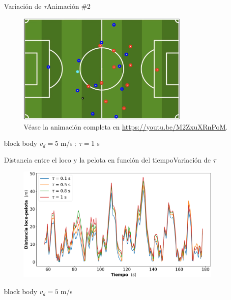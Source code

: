 \documentclass{beamer}
\begin{document}
            \begin{frame}{Variación de $\tau$}{Animación \#2}
                \vspace*{-0.3cm}
                \begin{figure}[H!]
                    \includegraphics[width=0.75\textwidth]{./animacion_5}
                    \caption*{Véase la animación completa en \url{https://youtu.be/M2ZxuXRnPoM}.}
                    \label{fig:futbol_7}
                \end{figure}
                \vspace*{-0.5cm}
                \begin{beamercolorbox}[sep=5pt,center]{block body}
                    \centering
                    \small{$v_d = 5$ m/s ; $\tau = 1$ s}
                \end{beamercolorbox}
            \end{frame}

            \begin{frame}{Distancia entre el loco y la pelota en función del tiempo}{Variación de $\tau$}
                \begin{figure}[H!]
                    \includegraphics[width=0.9\textwidth]{./distancia_vs_tiempo_tau}
                    \label{fig:futbol_8}
                \end{figure}
                \begin{beamercolorbox}[sep=5pt,center]{block body}
                    \centering
                    \small{$v_d = 5$ m/s}
                \end{beamercolorbox}
            \end{frame}
\end{document}
